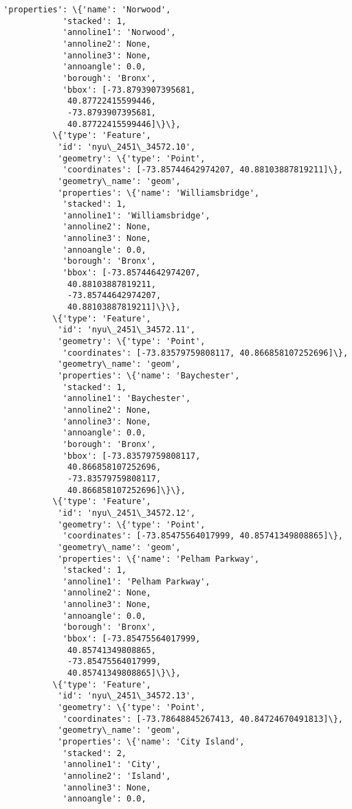 \documentclass[11pt]{article}
\begin{document}
\begin{Verbatim}[commandchars=\\\{\}]
           'properties': \{'name': 'Norwood',
            'stacked': 1,
            'annoline1': 'Norwood',
            'annoline2': None,
            'annoline3': None,
            'annoangle': 0.0,
            'borough': 'Bronx',
            'bbox': [-73.8793907395681,
             40.87722415599446,
             -73.8793907395681,
             40.87722415599446]\}\},
          \{'type': 'Feature',
           'id': 'nyu\_2451\_34572.10',
           'geometry': \{'type': 'Point',
            'coordinates': [-73.85744642974207, 40.88103887819211]\},
           'geometry\_name': 'geom',
           'properties': \{'name': 'Williamsbridge',
            'stacked': 1,
            'annoline1': 'Williamsbridge',
            'annoline2': None,
            'annoline3': None,
            'annoangle': 0.0,
            'borough': 'Bronx',
            'bbox': [-73.85744642974207,
             40.88103887819211,
             -73.85744642974207,
             40.88103887819211]\}\},
          \{'type': 'Feature',
           'id': 'nyu\_2451\_34572.11',
           'geometry': \{'type': 'Point',
            'coordinates': [-73.83579759808117, 40.866858107252696]\},
           'geometry\_name': 'geom',
           'properties': \{'name': 'Baychester',
            'stacked': 1,
            'annoline1': 'Baychester',
            'annoline2': None,
            'annoline3': None,
            'annoangle': 0.0,
            'borough': 'Bronx',
            'bbox': [-73.83579759808117,
             40.866858107252696,
             -73.83579759808117,
             40.866858107252696]\}\},
          \{'type': 'Feature',
           'id': 'nyu\_2451\_34572.12',
           'geometry': \{'type': 'Point',
            'coordinates': [-73.85475564017999, 40.85741349808865]\},
           'geometry\_name': 'geom',
           'properties': \{'name': 'Pelham Parkway',
            'stacked': 1,
            'annoline1': 'Pelham Parkway',
            'annoline2': None,
            'annoline3': None,
            'annoangle': 0.0,
            'borough': 'Bronx',
            'bbox': [-73.85475564017999,
             40.85741349808865,
             -73.85475564017999,
             40.85741349808865]\}\},
          \{'type': 'Feature',
           'id': 'nyu\_2451\_34572.13',
           'geometry': \{'type': 'Point',
            'coordinates': [-73.78648845267413, 40.84724670491813]\},
           'geometry\_name': 'geom',
           'properties': \{'name': 'City Island',
            'stacked': 2,
            'annoline1': 'City',
            'annoline2': 'Island',
            'annoline3': None,
            'annoangle': 0.0,

\end{Verbatim}
\end{document}
